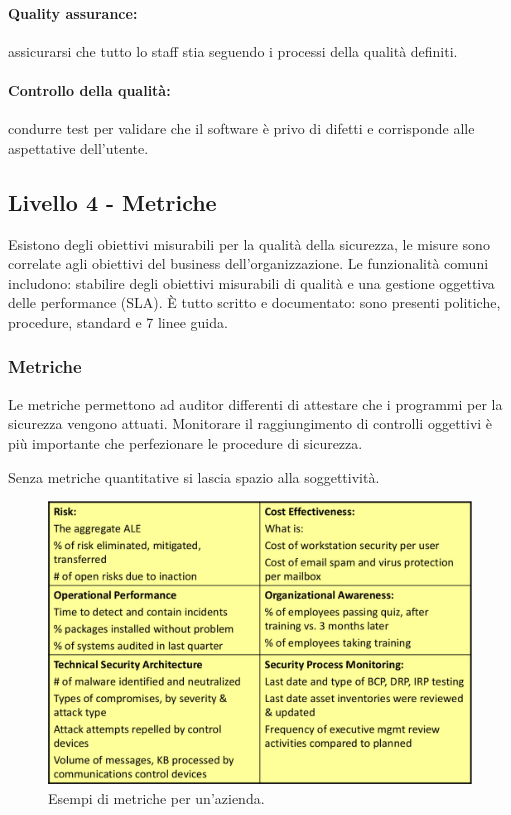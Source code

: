 \paragraph*{Quality assurance:} assicurarsi che tutto lo staff stia seguendo i 
processi della qualità definiti.

\paragraph*{Controllo della qualità:} condurre test per validare che il 
software è privo di difetti e corrisponde alle aspettative dell'utente.

\subsection{Livello 4 - Metriche}

Esistono degli obiettivi misurabili per la qualità della sicurezza, le misure 
sono correlate agli obiettivi del business dell'organizzazione. Le 
funzionalità comuni includono: stabilire degli obiettivi misurabili di qualità 
e una gestione oggettiva delle performance (SLA).
È tutto scritto e documentato: sono presenti politiche, procedure, standard e 7
linee guida.

\subsubsection{Metriche}

Le metriche permettono ad auditor differenti di attestare che i programmi per 
la sicurezza vengono attuati. Monitorare il raggiungimento di controlli 
oggettivi è più importante che perfezionare le procedure di sicurezza.

Senza metriche quantitative si lascia spazio alla soggettività.

\begin{figure}[h!]
        \begin{center}
                \includegraphics[scale=1.5]{res/img/metriche}
        \end{center}
        \caption{Esempi di metriche per un'azienda.}
\end{figure}


